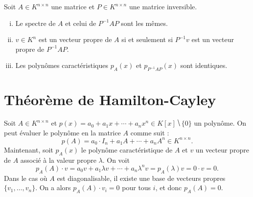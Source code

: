 \begin{theorem}
  \label{thr:46}
  Soit $A ∈ K^{n ×n}$ une matrice et $P ∈ K^{n ×n}$ une matrice inversible.
  \begin{enumerate}[i)]
  \item Le spectre de $A$ et celui de $P^{-1}AP$ sont les mêmes.
  \item $v ∈ K^n$ est un vecteur propre de $A$ si et seulement si $P^{-1} v$  est un vecteur propre de $P^{-1}AP$.
  \item Les polynômes caractéristiques $p_A(x)$ et $p_{P^{-1}AP}(x)$ sont identiques. 
  \end{enumerate}
\end{theorem}


\section{Théorème de Hamilton-Cayley}
\label{sec:theoreme-de-hamilton}


Soit $A ∈ K^{n ×n}$ et $p(x) = a_0 + a_1x + \cdots + a_n x^n ∈ K[x] ⧹\{0\}$ un polynôme. On peut évaluer le polynôme en la matrice $A$ comme suit :
\begin{displaymath}
  p(A) = a_0 ⋅I_n + a_1 A + \cdots + a_n A^n ∈ K^{n ×n}. 
\end{displaymath}
Maintenant, soit $p_A(x)$ le polynôme caractéristique de $A$ et $v$ un vecteur propre de $A$ associé à la valeur propre $λ$. On voit
\begin{displaymath}
  p_A(A) ⋅v = a_0 v + a_1 λv + \cdots + a_n λ^n v = p_A(λ)v = 0 ⋅v = 0. 
\end{displaymath}
Dans le cas où $A$ est diagonalisable, il existe une base de vecteurs propres $\{ v_1,\dots,v_n \}$. On a alors $p_A(A) ⋅v_i = 0$ pour tous $i$, et donc $p_A(A) =0$. 

